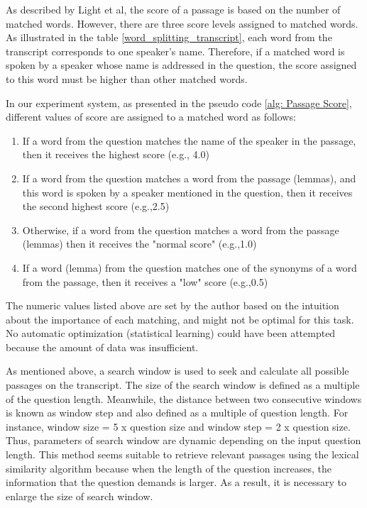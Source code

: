 As described by Light et al, the score of a passage is based on the number of matched words. However, there are three score levels assigned to matched words. As illustrated in the table \ref{word_splitting_transcript}, each word from the transcript corresponds to one speaker's name. Therefore, if a matched word is spoken by a speaker whose name is addressed in the question, the score assigned to this word must be higher than other matched words. 

In our experiment system, as presented in the pseudo code \ref{alg: Passage Score}, different values of score are assigned to a matched word as follows: 
\begin{enumerate}
\item {If a word from the question matches the name of the speaker in the passage, then it receives the highest score (e.g., 4.0)}
\item {If a word from the question matches a word from the passage (lemmas), and this word is spoken by a speaker mentioned in the question, then it receives the second highest score (e.g.,2.5)}
\item{Otherwise, if a word from the question matches a word from the passage (lemmas) then it receives the "normal score" (e.g.,1.0)}
\item{If a word (lemma) from the question matches one of the synonyms of a word from the passage, then it receives a "low" score (e.g.,0.5)}
\end{enumerate}

The numeric values listed above are set by the author based on the intuition about the importance of each matching, and might not be optimal for this task. No automatic optimization (statistical learning) could have been attempted because the amount of data was insufficient.


As mentioned above, a search window is used to seek and calculate all possible passages on the transcript. The size of the search window is defined as a multiple of the question length. Meanwhile, the distance between two consecutive windows is known as window step and also defined as a multiple of question length. For instance, window size = 5 x question size and window step = 2 x question size. Thus, parameters of search window are dynamic depending on the input question length. This method seems suitable to retrieve relevant passages using the lexical similarity algorithm because when the length of the question increases, the information that the question demands is larger. As a result, it is necessary to enlarge the size of search window.

